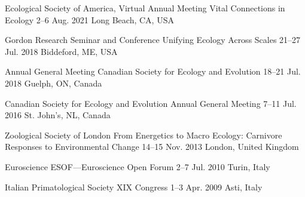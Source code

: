 

\begin{cventries}

  \cventry
    {Ecological Society of America, Virtual Annual Meeting} %
    {Vital Connections in Ecology} %
    {2--6 Aug. 2021} %
    {Long Beach, CA, USA} %
    {
    }

  \cventry
    {Gordon Research Seminar and Conference} %
    {Unifying Ecology Across Scales} %
    {21--27 Jul. 2018} %
    {Biddeford, ME, USA} %
    {
    }

  \cventry
    {Annual General Meeting} %
    {Canadian Society for Ecology and Evolution} %
    {18--21 Jul. 2018} %
    {Guelph, ON, Canada} %
    {
    }

  \cventry
    {Canadian Society for Ecology and Evolution} %
    {Annual General Meeting} %
    {7--11 Jul. 2016} %
    {St. John's, NL, Canada} %
    {
    }

  \cventry
    {Zoological Society of London} %
    {From Energetics to Macro Ecology: Carnivore Responses to Environmental Change} %
    {14--15 Nov. 2013} %
    {London, United Kingdom} %
    {
    }

  \cventry
    {Euroscience} %
    {ESOF---Euroscience Open Forum} %
    {2--7 Jul. 2010} %
    {Turin, Italy} %
    {
    }

  \cventry
    {Italian Primatological Society} %
    {XIX Congress} %
    {1--3 Apr. 2009} %
    {Asti, Italy} %
    {
    }

\end{cventries}
